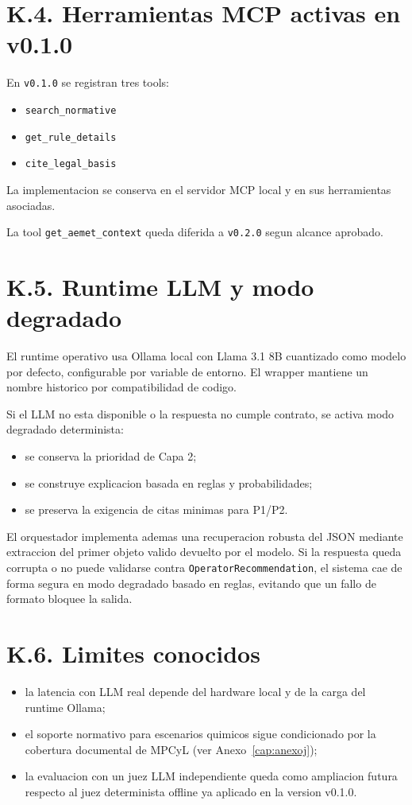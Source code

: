 \section*{K.4. Herramientas MCP activas en v0.1.0}

En \texttt{v0.1.0} se registran tres tools:

\begin{itemize}
    \item \texttt{search\_normative}
    \item \texttt{get\_rule\_details}
    \item \texttt{cite\_legal\_basis}
\end{itemize}

La implementacion se conserva en el servidor MCP local y en sus herramientas asociadas.

La tool \texttt{get\_aemet\_context} queda diferida a \texttt{v0.2.0}
segun alcance aprobado.

\section*{K.5. Runtime LLM y modo degradado}

El runtime operativo usa Ollama local con Llama 3.1 8B cuantizado como modelo por
defecto, configurable por variable de entorno. El wrapper mantiene un nombre historico
por compatibilidad de codigo.

Si el LLM no esta disponible o la respuesta no cumple contrato, se activa modo
degradado determinista:

\begin{itemize}
    \item se conserva la prioridad de Capa 2;
    \item se construye explicacion basada en reglas y probabilidades;
    \item se preserva la exigencia de citas minimas para P1/P2.
\end{itemize}

El orquestador implementa ademas una recuperacion robusta del JSON mediante extraccion
del primer objeto valido devuelto por el modelo. Si la respuesta queda corrupta o no
puede validarse contra \texttt{OperatorRecommendation}, el sistema cae de forma segura en
modo degradado basado en reglas, evitando que un fallo de formato bloquee la salida.

\section*{K.6. Limites conocidos}

\begin{itemize}
    \item la latencia con LLM real depende del hardware local y de la carga del
    runtime Ollama;
    \item el soporte normativo para escenarios quimicos sigue condicionado por la
    cobertura documental de MPCyL (ver Anexo~\ref{cap:anexoj});
    \item la evaluacion con un juez LLM independiente queda como ampliacion futura
    respecto al juez determinista offline ya aplicado en la version v0.1.0.
\end{itemize}
